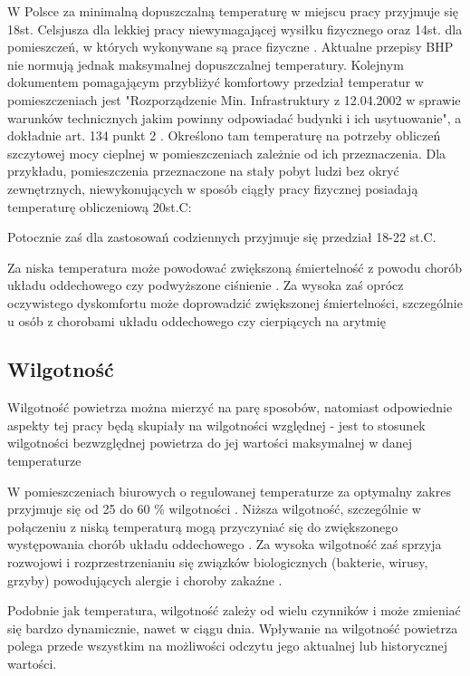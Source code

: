 W Polsce za minimalną dopuszczalną temperaturę w miejscu pracy przyjmuje się 18st. Celsjusza dla 
lekkiej pracy niewymagającej wysiłku fizycznego oraz 14st. dla pomieszczeń, w których wykonywane są prace 
fizyczne \cite{manutan-bhp}. Aktualne przepisy BHP nie normują jednak maksymalnej dopuszczalnej temperatury. 
Kolejnym dokumentem pomagającym przybliżyć komfortowy przedział temperatur w pomieszczeniach jest
"Rozporządzenie Min. Infrastruktury z 12.04.2002 w sprawie warunków technicznych jakim powinny odpowiadać 
budynki i ich usytuowanie", a dokładnie art. 134 punkt 2 \cite{rozp-bud}. Określono tam temperaturę na potrzeby obliczeń szczytowej 
mocy cieplnej w pomieszczeniach zależnie od ich przeznaczenia.
Dla przykładu, pomieszczenia przeznaczone na stały pobyt ludzi bez okryć zewnętrznych, niewykonujących 
w sposób ciągły pracy fizycznej posiadają temperaturę obliczeniową 20st.C:

Potocznie zaś dla zastosowań codziennych przyjmuje się przedział 18-22 st.C.

Za niska temperatura może powodować zwiększoną śmiertelność z powodu chorób układu oddechowego czy podwyższone 
ciśnienie \cite{who-cold}. Za wysoka zaś oprócz oczywistego dyskomfortu może doprowadzić zwiększonej śmiertelności, 
szczególnie u osób z chorobami układu oddechowego czy cierpiących na arytmię \cite{bmj-heat}

\subsection{Wilgotność}

Wilgotność powietrza można mierzyć na parę sposobów, natomiast odpowiednie aspekty tej pracy będą 
skupiały na wilgotności względnej - jest to stosunek wilgotności bezwzględnej powietrza do jej wartości 
maksymalnej w danej temperaturze \cite{termodynamika}

W pomieszczeniach biurowych o regulowanej temperaturze za optymalny zakres przyjmuje się 
od 25 do 60 \% wilgotności \cite{inz-bud}. Niższa wilgotność, szczególnie w połączeniu z niską temperaturą 
mogą przyczyniać się do zwiększonego występowania chorób układu oddechowego \cite{low-hum}. Za wysoka wilgotność 
zaś sprzyja rozwojowi i rozprzestrzenianiu się związków biologicznych (bakterie, wirusy, grzyby) 
powodujących alergie i choroby zakaźne \cite{high-hum}.

Podobnie jak temperatura, wilgotność zależy od wielu czynników i może zmieniać się bardzo dynamicznie, 
nawet w ciągu dnia. Wpływanie na wilgotność powietrza polega przede wszystkim na możliwości odczytu 
jego aktualnej lub historycznej wartości.

